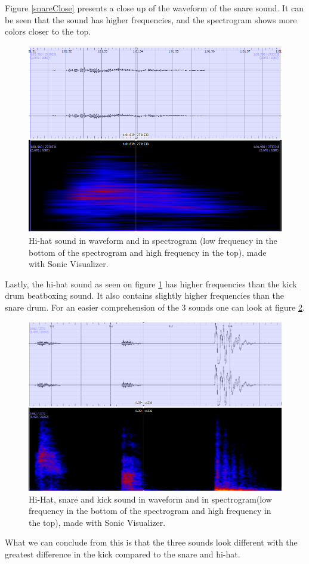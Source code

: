 \begin{flushleft}
Figure \ref{snareClose} presents a close up of the waveform of the snare sound. It can be seen that the sound has higher frequencies, and the spectrogram shows more colors closer to the top. 
\end{flushleft}
\begin{figure}[H]
	\begin{center}
		\includegraphics[scale =  0.5]{fig/HH-close-up-with-spectrogram.png}
		\caption{Hi-hat sound in waveform and in spectrogram (low frequency in the bottom of the spectrogram and high frequency in the top), made with Sonic Visualizer.}
		\label{HHClose}
	\end{center}
\end{figure}
Lastly, the hi-hat sound as seen on figure \ref{HHClose} has higher frequencies than the kick drum beatboxing sound. It also contains slightly higher frequencies than the snare drum. For an easier comprehension of the 3 sounds one can look at figure \ref{HH-Snare-Kick}.
\begin{figure}[H]
	\begin{center}
		\includegraphics[scale =  0.5]{fig/hh-snare-kick-with-spectogram.png}
		\caption{Hi-Hat, snare and kick sound in waveform and in spectrogram(low frequency in the bottom of the spectrogram and high frequency in the top), made with Sonic Visualizer.}
		\label{HH-Snare-Kick}
	\end{center}
\end{figure}
What we can conclude from this is that the three sounds look different with the greatest difference in the kick compared to the snare and hi-hat.